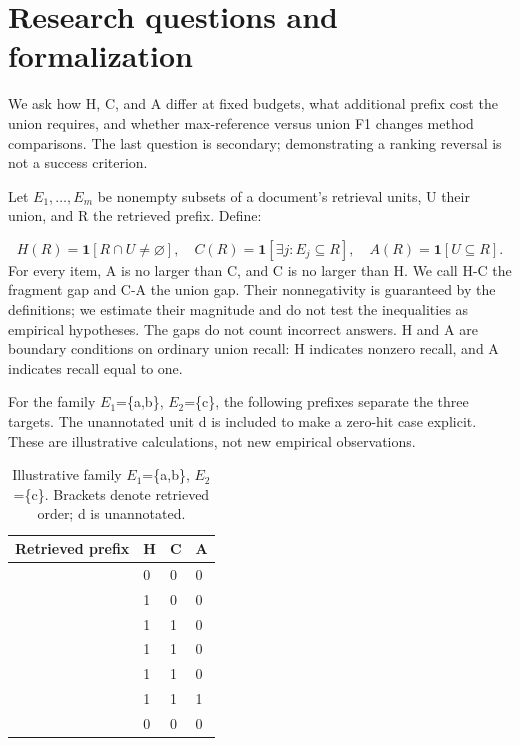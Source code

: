 \documentclass[twoside,a4paper,11pt]{article}
\begin{document}
\section{Research questions and formalization}
We ask how H, C, and A differ at fixed budgets, what additional prefix cost the union requires, and whether max-reference versus union F1 changes method comparisons. The last question is secondary; demonstrating a ranking reversal is not a success criterion.

Let $E_1,\ldots,E_m$ be nonempty subsets of a document's retrieval units, U their union, and R the retrieved prefix. Define:

\[
H(R)=\mathbf{1}[R\cap U\ne\varnothing],\quad C(R)=\mathbf{1}[\exists j:E_j\subseteq R],\quad A(R)=\mathbf{1}[U\subseteq R].
\]
For every item, A is no larger than C, and C is no larger than H. We call H-C the fragment gap and C-A the union gap. Their nonnegativity is guaranteed by the definitions; we estimate their magnitude and do not test the inequalities as empirical hypotheses. The gaps do not count incorrect answers. H and A are boundary conditions on ordinary union recall: H indicates nonzero recall, and A indicates recall equal to one.

For the family $E_{1}$=\{a,b\}, $E_{2}$=\{c\}, the following prefixes separate the three targets. The unannotated unit d is included to make a zero-hit case explicit. These are illustrative calculations, not new empirical observations.

\begin{table}[!htbp]\centering\small\caption{Illustrative family $E_{1}$=\{a,b\}, $E_{2}$=\{c\}. Brackets denote retrieved order; d is unannotated.}
\begin{tabular}{>{\raggedright\arraybackslash}p{225.0pt}>{\raggedright\arraybackslash}p{53.0pt}>{\raggedright\arraybackslash}p{53.0pt}>{\raggedright\arraybackslash}p{53.0pt}}
\toprule
\textbf{Retrieved prefix} & \textbf{H} & \textbf{C} & \textbf{A} \\
\midrule
{[]} & {0} & {0} & {0} \\
{[a]} & {1} & {0} & {0} \\
{[a,b]} & {1} & {1} & {0} \\
{[c]} & {1} & {1} & {0} \\
{[a,c]} & {1} & {1} & {0} \\
{[a,b,c]} & {1} & {1} & {1} \\
{[d]} & {0} & {0} & {0} \\
\bottomrule\end{tabular}\end{table}
\end{document}
